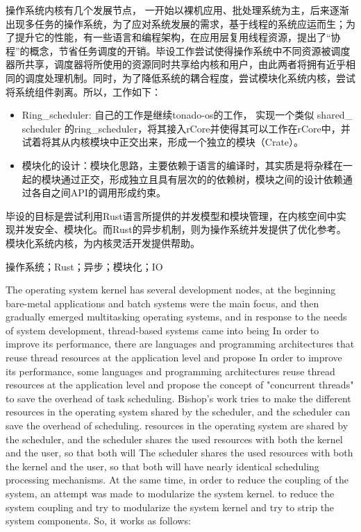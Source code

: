 \setlength{\headheight}{1.5cm}

\abstractcn


操作系统内核有几个发展节点， 一开始以裸机应用、批处理系统为主，后来逐渐出现多任务的操作系统，为了应对系统发展的需求，基于线程的系统应运而生；为了提升它的性能，有一些语言和编程架构，在应用层复用线程资源，提出了“协程”的概念，节省任务调度的开销。毕设工作尝试使得操作系统中不同资源被调度器所共享，调度器将所使用的资源同时共享给内核和用户，由此两者将拥有近乎相同的调度处理机制。同时，为了降低系统的耦合程度，尝试模块化系统内核，尝试将系统组件剥离。所以，工作如下：

\begin{itemize}
\item Ring\_scheduler: 自己的工作是继续tonado-os的工作， 实现一个类似 shared\_ scheduler 的ring\_scheduler，将其接入rCore并使得其可以工作在rCore中，并试着将其从内核模块中正交出来，形成一个独立的模块（Crate）。 

\item 模块化的设计：模块化思路，主要依赖于语言的编译时，其实质是将杂糅在一起的模块通过正交，形成独立且具有层次的的依赖树，模块之间的设计依赖通过各自之间API的调用形成约束。
\end{itemize}


毕设的目标是尝试利用Rust语言所提供的并发模型和模块管理，在内核空间中实现并发安全、模块化。而Rust的异步机制，则为操作系统并发提供了优化参考。模块化系统内核，为内核灵活开发提供帮助。

\keywordscn\quad 操作系统；Rust；异步；模块化；IO
\abstracten

The operating system kernel has several development nodes, at the beginning bare-metal applications and batch systems were the main focus, and then gradually emerged multitasking operating systems, and in response to the needs of system development, thread-based systems came into being In order to improve its performance, there are languages and programming architectures that reuse thread resources at the application level and propose In order to improve its performance, some languages and programming architectures reuse thread resources at the application level and propose the concept of "concurrent threads" to save the overhead of task scheduling. Bishop's work tries to make the different resources in the operating system shared by the scheduler, and the scheduler can save the overhead of scheduling. resources in the operating system are shared by the scheduler, and the scheduler shares the used resources with both the kernel and the user, so that both will The scheduler shares the used resources with both the kernel and the user, so that both will have nearly identical scheduling processing mechanisms. At the same time, in order to reduce the coupling of the system, an attempt was made to modularize the system kernel. to reduce the system coupling and try to modularize the system kernel and try to strip the system components. So, it works as follows:

